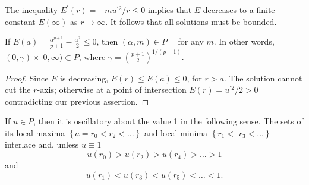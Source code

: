 The inequality $E^{\prime}(r) = -m u^{\prime 2} / r \leq 0$ implies that $E$ decreases to a
finite constant $E(\infty)$ as $r \rightarrow \infty$. It follows that all solutions must be
bounded.

\begin{lemma}\label{lemma:8}
  If $E(a)=\frac{\alpha^{p+1}}{p+1}-\frac{\alpha^2}{2} \leq 0$, then $(\alpha, m) \in P \quad$ for any $m$. In other words, $(0, \gamma) \times[0, \infty) \subset P$, where $\gamma=\left(\frac{p+1}{2}\right)^{1 /(p-1)}$.
\end{lemma}

\begin{proof}
  Since $E$ is decreasing, $E(r) \leq E(a) \leq 0$, for $r>a$.
  The solution cannot cut the
  $r$-axis; otherwise at a point of intersection
  $E(r)=u^{\prime 2} / 2>0$ contradicting our
  previous assertion.
\end{proof}

\begin{lemma}\label{lemma:9}
  If $u \in P$, then it is oscillatory about the value 1 in the following sense.
  The sets of its local maxima $\left\{a=r_0<r_2<\ldots\right\}$
  and local minima $\left\{r_1<\right.$ $\left.r_3<\ldots\right\}$ interlace and, 
  unless $u \equiv 1$
  \begin{equation}\label{eq:3.7}
    u\left(r_0\right)>u\left(r_2\right)>u\left(r_4\right)>\ldots>1    
  \end{equation}
  and
  \begin{equation}\label{eq:3.8}
    u\left(r_1\right)<u\left(r_3\right)<u\left(r_5\right)<\ldots<1.    
  \end{equation}
\end{lemma}


